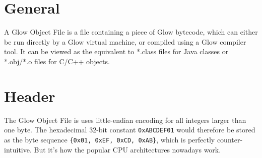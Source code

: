 \documentclass[12pt]{article}
\begin{document}
\maketitle

\section{General}

A Glow Object File is a file containing a piece of Glow bytecode, which
can either be run directly by a Glow virtual machine, or compiled using
a Glow compiler tool.
It can be viewed as the equivalent to *.class files for Java classes or
*.obj/*.o files for C/C++ objects.



\section{Header}
The Glow Object File is uses little-endian encoding for all integers
larger than one byte. The hexadecimal 32-bit constant \texttt{0xABCDEF01} would
therefore be stored as the byte sequence \texttt{\{0x01, 0xEF, 0xCD, 0xAB\}},
which is perfectly counter-intuitive. But it's how the popular CPU architectures
nowadays work.
\end{document}
